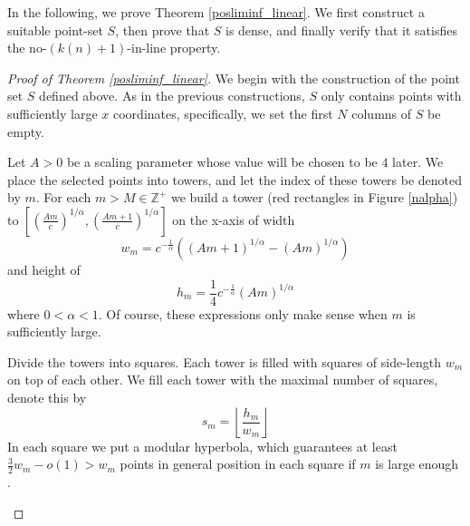 \documentclass[11pt,a4paper]{article}
\numberwithin{equation}{section}
\newcommand{\Z}{\mathbb{Z}}
\begin{document}
In the following, we prove Theorem \ref{posliminf_linear}.
    We first construct a suitable point-set $S$, then prove that $S$ is dense, and finally verify that it satisfies the no-$(k(n)+1)$-in-line property.

    \begin{proof}[Proof of Theorem \ref{posliminf_linear}]
    We begin with the construction of the point set $S$ defined above.
    As in the previous constructions, $S$ only contains points with sufficiently large $x$ coordinates, specifically, we set the first $N$ columns of $S$ be empty.
    
    Let $A>0$ be a scaling parameter whose value will be chosen to be $4$ later. 
     We place the selected points into towers, and let the index of these towers be denoted by $m$. For each $m>M \in \Z^+$ we build a tower (red rectangles in Figure \ref{nalpha}) to $[(\frac{Am}{c})^{1/\alpha}, (\frac{Am+1}{c})^{1/\alpha}]$ on the x-axis of width 
    $$w_m = c^{-\frac1\alpha}\left((Am+1)^{1/\alpha} - ({Am})^{1/\alpha}\right)$$
    and height of 
    $$
    h_m = \frac{1}{4}c^{-\frac1\alpha}(Am)^{1/\alpha}
    $$
    where $0<\alpha <1$.
    Of course, these expressions only make sense when $m$ is sufficiently large.

    
    Divide the towers into squares. Each tower is filled with squares of side-length $w_m$ on top of each other. We fill each tower with the maximal number of squares, denote this by 
    $$
    s_m =\left\lfloor\frac{h_m}{w_m}\right\rfloor
    $$
    In each square we put a modular hyperbola,  which guarantees at least $\frac32w_m - o(1) > w_m$ points in general position in each square if $m$ is large enough \cite{hall1975some}.

\begin{figure}[h!!]
\centering
{}
\end{figure}
\end{proof}
\end{document}
